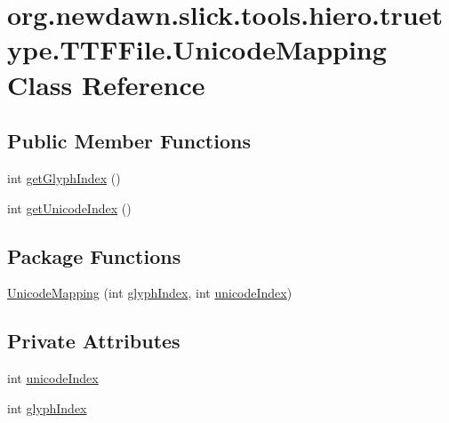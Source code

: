 \hypertarget{classorg_1_1newdawn_1_1slick_1_1tools_1_1hiero_1_1truetype_1_1_t_t_f_file_1_1_unicode_mapping}{}\section{org.\+newdawn.\+slick.\+tools.\+hiero.\+truetype.\+T\+T\+F\+File.\+Unicode\+Mapping Class Reference}
\label{classorg_1_1newdawn_1_1slick_1_1tools_1_1hiero_1_1truetype_1_1_t_t_f_file_1_1_unicode_mapping}
\subsection*{Public Member Functions}
\begin{DoxyCompactItemize}
\item 
int \mbox{\hyperlink{classorg_1_1newdawn_1_1slick_1_1tools_1_1hiero_1_1truetype_1_1_t_t_f_file_1_1_unicode_mapping_a8e509b3fe7ce38cc469fb0dd71a39486}{get\+Glyph\+Index}} ()
\item 
int \mbox{\hyperlink{classorg_1_1newdawn_1_1slick_1_1tools_1_1hiero_1_1truetype_1_1_t_t_f_file_1_1_unicode_mapping_a8aa4cc05ddc34ac0b6bd20c833f89f7c}{get\+Unicode\+Index}} ()
\end{DoxyCompactItemize}
\subsection*{Package Functions}
\begin{DoxyCompactItemize}
\item 
\mbox{\hyperlink{classorg_1_1newdawn_1_1slick_1_1tools_1_1hiero_1_1truetype_1_1_t_t_f_file_1_1_unicode_mapping_ae3966726c0e1daca7fc6f0d917424e7c}{Unicode\+Mapping}} (int \mbox{\hyperlink{classorg_1_1newdawn_1_1slick_1_1tools_1_1hiero_1_1truetype_1_1_t_t_f_file_1_1_unicode_mapping_a55775fd2735847638605b42c45e58eed}{glyph\+Index}}, int \mbox{\hyperlink{classorg_1_1newdawn_1_1slick_1_1tools_1_1hiero_1_1truetype_1_1_t_t_f_file_1_1_unicode_mapping_ab35d217986f4bf074a1861fd1ea71343}{unicode\+Index}})
\end{DoxyCompactItemize}
\subsection*{Private Attributes}
\begin{DoxyCompactItemize}
\item 
int \mbox{\hyperlink{classorg_1_1newdawn_1_1slick_1_1tools_1_1hiero_1_1truetype_1_1_t_t_f_file_1_1_unicode_mapping_ab35d217986f4bf074a1861fd1ea71343}{unicode\+Index}}
\item 
int \mbox{\hyperlink{classorg_1_1newdawn_1_1slick_1_1tools_1_1hiero_1_1truetype_1_1_t_t_f_file_1_1_unicode_mapping_a55775fd2735847638605b42c45e58eed}{glyph\+Index}}
\end{DoxyCompactItemize}


